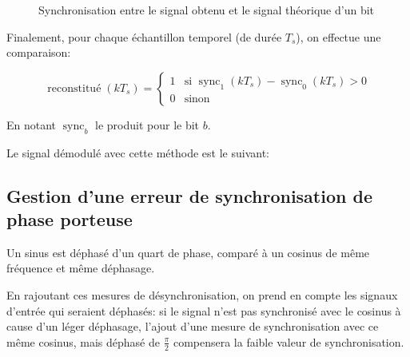 \documentclass{article}
\begin{document}
\begin{center}
\begin{figure}[H]
	\centering
	\caption{Synchronisation entre le signal obtenu et le signal théorique d'un bit}
\end{figure}
\end{center}

Finalement, pour chaque échantillon temporel (de durée $T_s$), on effectue une comparaison:

$$
\operatorname{reconstitué}(kT_s) = \begin{cases}
    1 & \text{si } \operatorname{sync}_1(kT_s) - \operatorname{sync}_0(kT_s) > 0 \\
    0 & \text{sinon}
\end{cases}
$$

En notant $\operatorname{sync}_b$ le produit pour le bit $b$.

Le signal démodulé avec cette méthode est le suivant:


\begin{figure}
\end{figure}



\subsection{Gestion d'une erreur de synchronisation de phase porteuse}

Un sinus est déphasé d'un quart de phase, comparé à un cosinus de même fréquence et même déphasage.

En rajoutant ces mesures de désynchronisation, on prend en compte les signaux d'entrée qui seraient déphasés: si le signal n'est pas synchronisé avec le cosinus à cause d'un léger déphasage, l'ajout d'une mesure de synchronisation avec ce même cosinus, mais déphasé de $\frac{\pi}{2}$ compensera la faible valeur de synchronisation.
\end{document}
